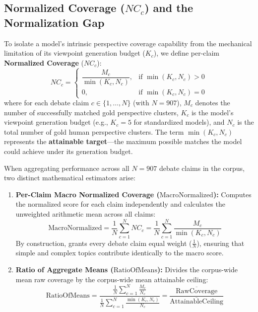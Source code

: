 \documentclass[11pt,a4paper]{article}
\begin{document}
\subsection{Normalized Coverage ($NC_c$) and the Normalization Gap}
\label{subsec:normalized_coverage}

To isolate a model's intrinsic perspective coverage capability from the mechanical limitation of its viewpoint generation budget ($K_c$), we define per-claim \textbf{Normalized Coverage} ($NC_c$):
\begin{equation}
\label{eq:nc_c}
NC_c = \begin{cases} 
\dfrac{M_c}{\min(K_c, N_c)}, & \text{if } \min(K_c, N_c) > 0 \\[0.5em]
0, & \text{if } \min(K_c, N_c) = 0
\end{cases}
\end{equation}
where for each debate claim $c \in \{1, \dots, N\}$ (with $N = 907$), $M_c$ denotes the number of successfully matched gold perspective clusters, $K_c$ is the model's viewpoint generation budget (e.g., $K_c = 5$ for standardized models), and $N_c$ is the total number of gold human perspective clusters. The term $\min(K_c, N_c)$ represents the \textbf{attainable target}---the maximum possible matches the model could achieve under its generation budget.

When aggregating performance across all $N = 907$ debate claims in the corpus, two distinct mathematical estimators arise:
\begin{enumerate}[leftmargin=*,itemsep=4pt]
    \item \textbf{Per-Claim Macro Normalized Coverage ($\text{MacroNormalized}$):} Computes the normalized score for each claim independently and calculates the unweighted arithmetic mean across all claims:
    \begin{equation}
    \label{eq:macro_normalized}
    \text{MacroNormalized} = \frac{1}{N} \sum_{c=1}^N NC_c = \frac{1}{N} \sum_{c=1}^N \frac{M_c}{\min(K_c, N_c)}
    \end{equation}
    By construction,  grants every debate claim equal weight ($\frac{1}{N}$), ensuring that simple and complex topics contribute identically to the macro score.

    \item \textbf{Ratio of Aggregate Means ($\text{RatioOfMeans}$):} Divides the corpus-wide mean raw coverage by the corpus-wide mean attainable ceiling:
    \begin{equation}
    \label{eq:ratio_of_means}
    \text{RatioOfMeans} = \frac{\displaystyle \frac{1}{N} \sum_{c=1}^N \frac{M_c}{N_c}}{\displaystyle \frac{1}{N} \sum_{c=1}^N \frac{\min(K_c, N_c)}{N_c}} = \frac{\overline{\text{RawCoverage}}}{\overline{\text{AttainableCeiling}}}
    \end{equation}
\end{enumerate}
\end{document}
